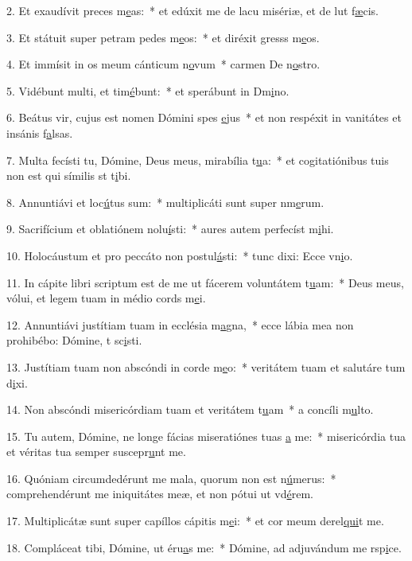 2. Et exaudívit preces m\uline{e}as:~* et edúxit me de lacu misériæ, et de lut f\uline{æ}cis.\par 
3. Et státuit super petram pedes m\uline{e}os:~* et diréxit gresss m\uline{e}os.\par 
4. Et immísit in os meum cánticum n\uline{o}vum~* carmen De n\uline{o}stro.\par 
5. Vidébunt multi, et tim\uline{é}bunt:~* et sperábunt in Dm\uline{i}no.\par 
6. Beátus vir, cujus est nomen Dómini spes \uline{e}jus~* et non respéxit in vanitátes et insánis f\uline{a}lsas.\par 
7. Multa fecísti tu, Dómine, Deus meus, mirabília t\uline{u}a:~* et cogitatiónibus tuis non est qui símilis st t\uline{i}bi.\par 
8. Annuntiávi et loc\uline{ú}tus sum:~* multiplicáti sunt super nm\uline{e}rum.\par 
9. Sacrifícium et oblatiónem nolu\uline{í}sti:~* aures autem perfecíst m\uline{i}hi.\par 
10. Holocáustum et pro peccáto non postul\uline{á}sti:~* tunc dixi: Ecce vn\uline{i}o.\par 
11. In cápite libri scriptum est de me ut fácerem voluntátem t\uline{u}am:~* Deus meus, vólui, et legem tuam in médio cords m\uline{e}i.\par 
12. Annuntiávi justítiam tuam in ecclésia m\uline{a}gna,~* ecce lábia mea non prohibébo: Dómine, t sc\uline{i}sti.\par 
13. Justítiam tuam non abscóndi in corde m\uline{e}o:~* veritátem tuam et salutáre tum d\uline{i}xi.\par 
14. Non abscóndi misericórdiam tuam et veritátem t\uline{u}am~* a concíli m\uline{u}lto.\par 
15. Tu autem, Dómine, ne longe fácias miseratiónes tuas \uline{a} me:~* misericórdia tua et véritas tua semper suscepr\uline{u}nt me.\par 
16. Quóniam circumdedérunt me mala, quorum non est n\uline{ú}merus:~* comprehendérunt me iniquitátes meæ, et non pótui ut vd\uline{é}rem.\par 
17. Multiplicátæ sunt super capíllos cápitis m\uline{e}i:~* et cor meum derel\uline{qui}t me.\par 
18. Compláceat tibi, Dómine, ut éru\uline{a}s me:~* Dómine, ad adjuvándum me rsp\uline{i}ce.\par 
